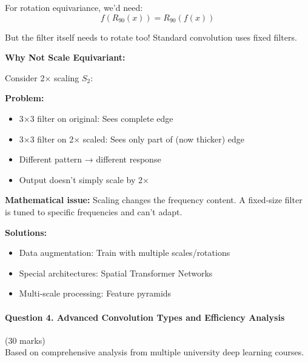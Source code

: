\documentclass[12pt]{article}
\newcommand{\explanation}[1]{{\color{explanationcolor}#1}}
\begin{document}
\begin{enumerate}[(a)]
{{    For rotation equivariance, we'd need:
    \[f(R_{90}(x)) = R_{90}(f(x))\]
    
    But the filter itself needs to rotate too! Standard convolution uses fixed filters.
    }
    
    \textbf{Why Not Scale Equivariant:}
    
    \explanation{
    Consider 2× scaling $S_2$:
    
    \textbf{Problem:}
    \begin{itemize}
        \item 3×3 filter on original: Sees complete edge
        \item 3×3 filter on 2× scaled: Sees only part of (now thicker) edge
        \item Different pattern → different response
        \item Output doesn't simply scale by 2×
    \end{itemize}
    
    \textbf{Mathematical issue:}
    Scaling changes the frequency content. A fixed-size filter is tuned to specific frequencies and can't adapt.
    
    \textbf{Solutions:}
    \begin{itemize}
        \item Data augmentation: Train with multiple scales/rotations
        \item Special architectures: Spatial Transformer Networks
        \item Multi-scale processing: Feature pyramids
    \end{itemize}
    }
    }
\end{enumerate}

\newpage
\paragraph{Question 4. Advanced Convolution Types and Efficiency Analysis}{{\hfill (30 marks)}}\\
Based on comprehensive analysis from multiple university deep learning courses.
\end{document}
